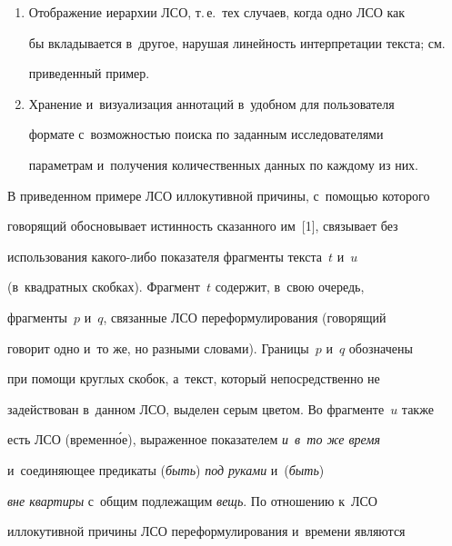 \begin{enumerate}[1.]
(Как не идеально!)$q$]$t$ [\tabcolsep=0pt\begin{tabular}{c}


{\cellcolor[gray]{.8}Вещь}\end{tabular} (под руками)\,r\ \textit{и~в~то же время} (вне 


квартиры)\,s]$u$ [Михаил Булгаков. Белая гвардия (1924)].


\item Отображение иерархии ЛСО, т.\,е.\ тех случаев, когда одно ЛСО как 


бы вкладывается в~другое, нарушая линейность интерпретации текста; см.\ 


приведенный пример.


\item Хранение и~визуализация аннотаций в~удобном для пользователя 


формате с~возможностью поиска по заданным исследователями 


параметрам и~получения количественных данных по каждому из них. 


\end{enumerate}





  В приведенном примере ЛСО иллокутивной причины, с~помощью которого 


говорящий обосновывает истинность сказанного им~[1], связывает без 


использования ка\-ко\-го-ли\-бо показателя фрагменты текста~$t$ и~$u$ 


(в~квадратных скобках). Фрагмент~$t$ содержит, в~свою очередь, 


фрагменты~$p$ и~$q$, связанные ЛСО переформулирования (говорящий 


говорит одно и~то же, но разными словами). Границы~$p$ и~$q$ обозначены 


при помощи круглых скобок, а~текст, который непосредственно не 


задействован в~данном ЛСО, выделен серым цветом. Во фрагменте~$u$ также 


есть ЛСО (временн\'{о}е), выраженное показателем \textit{и~в~то же время} 


и~соединяющее предикаты (\textit{быть}) \textit{под руками} и~(\textit{быть}) 


\textit{вне квартиры} с~общим подлежащим \textit{вещь}. По отношению к~ЛСО 


иллокутивной причины ЛСО переформулирования и~времени являются 


